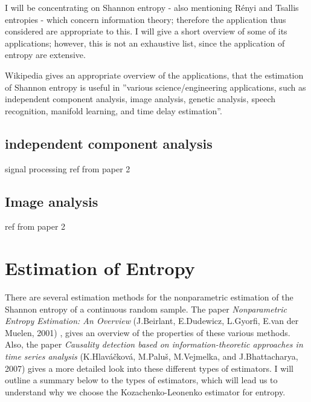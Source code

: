 \documentclass{article}
\begin{document}
I will be concentrating on Shannon entropy - also mentioning R\'enyi and Tsallis entropies - which concern information theory; therefore the application thus considered are appropriate to this. I will give a short overview of some of its applications; however, this is not an exhaustive list, since the application of entropy are extensive.

Wikipedia gives an appropriate overview of the applications, that the estimation of Shannon entropy is useful in ''various science/engineering applications, such as independent component analysis, image analysis, genetic analysis, speech recognition, manifold learning, and time delay estimation''.

\subsection{independent component analysis}

signal processing ref from paper 2


\subsection{Image analysis}
 ref from paper 2
 
 
 





\section{Estimation of Entropy}

There are several estimation methods for the nonparametric estimation of the Shannon entropy of a continuous random sample. The paper \textit{Nonparametric Entropy Estimation: An Overview} (J.Beirlant, E.Dudewicz, L.Gyorfi, E.van der Muelen, 2001) \cite{paper10}, gives an overview of the properties of these various methods. Also, the paper \textit{Causality detection based on information-theoretic approaches in time series analysis} (K.Hlav\'{a}\v{c}kov\'{a}, M.Palu\v{s}, M.Vejmelka, and J.Bhattacharya, 2007) gives a more detailed look into these different types of estimators. I will outline a summary below to the types of estimators, which will lead us to understand why we choose the Kozachenko-Leonenko estimator for entropy. 
\end{document}

